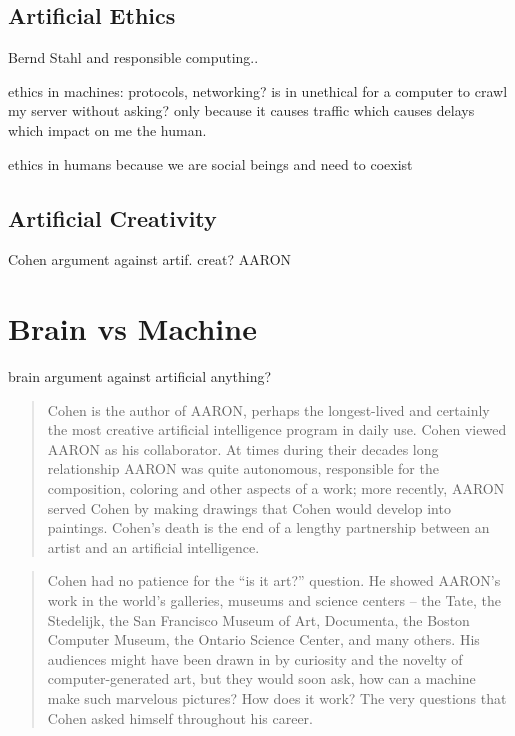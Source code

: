 \documentclass[11pt]{thesis} %
\begin{document}
\subsection{Artificial Ethics}

Bernd Stahl and responsible computing..

ethics in machines: protocols, networking? is in unethical for a computer to crawl my server without asking? only because it causes traffic which causes delays which impact on me the human.

ethics in humans because we are social beings and need to coexist


\subsection{Artificial Creativity}

Cohen argument against artif. creat? AARON



\section{Brain vs Machine}

brain argument against artificial anything?







\spirals



\spirals

\begin{quotation}
  Cohen is the author of AARON, perhaps the longest-lived and certainly the most creative artificial intelligence program in daily use. Cohen viewed AARON as his collaborator. At times during their decades long relationship AARON was quite autonomous, responsible for the composition, coloring and other aspects of a work; more recently, AARON served Cohen by making drawings that Cohen would develop into paintings. Cohen's death is the end of a lengthy partnership between an artist and an artificial intelligence.
\end{quotation}

\begin{quotation}
  Cohen had no patience for the ``is it art?'' question. He showed AARON's work in the world's galleries, museums and science centers -- the Tate, the Stedelijk, the San Francisco Museum of Art, Documenta, the Boston Computer Museum, the Ontario Science Center, and many others. His audiences might have been drawn in by curiosity and the novelty of computer-generated art, but they would soon ask, how can a machine make such marvelous pictures? How does it work? The very questions that Cohen asked himself throughout his career.
\end{quotation}
\end{document}
